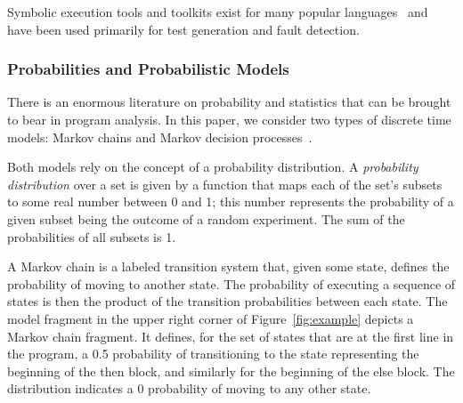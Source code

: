 Symbolic execution tools and toolkits exist for many popular 
languages~\cite{pasareanu2010symbolic,godefroid2005dart,jamrozik2013generating,cadar2008klee}
and have been used primarily for test generation and fault detection.

\subsubsection{Probabilities and Probabilistic Models}

There is an enormous literature on probability and statistics
that can be brought to bear in program analysis.  
In this paper, we consider two types of discrete time models:
Markov chains and Markov decision processes~\cite{AllOfStatistics}.

Both models rely on the concept of a probability distribution.
A \textit{probability distribution} over a set is given by a function
that maps each of the set's subsets to some real number between 0 and 1;
this number represents the probability of a given subset being the outcome
of a random experiment.
The sum of the probabilities of all subsets is 1.


A Markov chain is a labeled transition system that, given some
state, defines the probability of moving to another state.
The probability of executing a sequence of states is then the
product of the transition probabilities between each state.
The model fragment in the upper right corner of 
Figure~\ref{fig:example} depicts a Markov chain fragment.
It defines, for the set of states 
that are at the first line in the program, 
a 0.5 probability of transitioning to 
the state representing the beginning of the then block,
and similarly for the beginning of the else block.  The
distribution indicates a 0 probability of moving to any
other state.

